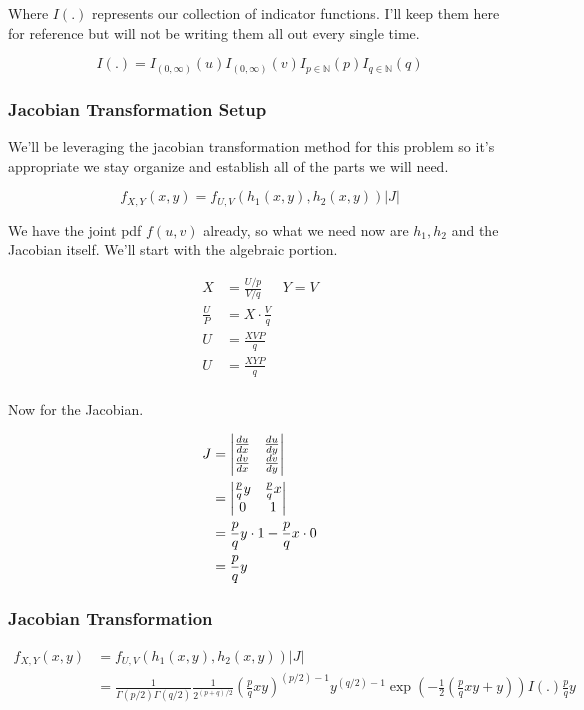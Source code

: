 Where $I(.)$ represents our collection of indicator functions. I'll keep them here for reference but will not be writing them all out every single time.

	\[I(.) = I_{(0,\infty)}(u)I_{(0,\infty)}(v)I_{p \in \mathbb{N}}(p)I_{q \in \mathbb{N}}(q)\]

\subsubsection*{Jacobian Transformation Setup}

We'll be leveraging the jacobian transformation method for this problem so it's appropriate we stay organize and establish all of the parts we will need.

\[
	f_{X,Y}(x,y) = f_{U,V}(h_1(x,y), h_2(x,y)) |J|
\]

We have the joint pdf $f(u,v)$ already, so what we need now are $h_1, h_2$ and the Jacobian itself. We'll start with the algebraic portion.

\begin{align*}
	X &= \frac{U/p}{V/q} & Y=V \\
	\frac{U}{P} &= X \cdot \frac{V}{q} \\
	U &= \frac{XVP}{q} \\
	U &= \frac{XYP}{q} \\
\end{align*}

Now for the Jacobian.

\begin{align*}
	J &= \m{v}{\frac{du}{dx} & \frac{du}{dy} \\ \frac{dv}{dx} & \frac{dv}{dy}} \\
	&= \m{v}{\frac{p}{q} y & \frac{p}{q} x \\  0 & 1 } \\
	&= \frac{p}{q} y \cdot 1 - \frac{p}{q} x \cdot 0 \\ 
	&= \frac{p}{q} y
\end{align*}

\subsubsection*{Jacobian Transformation}

\begin{align*}
	f_{X,Y}(x,y) &= f_{U,V}(h_1(x,y), h_2(x,y)) |J| \\
	&= \frac{1}{\Gamma(p/2)\Gamma(q/2)} 
	\frac{1}{2^{(p+q)/2}} 
	\left( \frac{p}{q}xy \right)^{(p/2)-1} 
	y^{(q/2)-1} 
	\exp\left( -\frac{1}{2} \left( \frac{p}{q}xy + y \right) \right) 
	I(.) \frac{p}{q}y
\end{align*}

